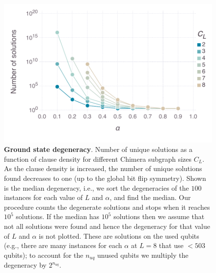 \begin{figure}[t]
\begin{center}
\includegraphics[width=\columnwidth]{chapters/Planted/problem_degeneracy_fullsize}
\caption{\textbf{Ground state degeneracy}.
Number of unique solutions as a function of clause density for different Chimera subgraph sizes $C_L$.
As the clause density is increased, the number of unique solutions found decreases to one (up to the global bit flip symmetry).
Shown is the median degeneracy, i.e., we sort the degeneracies of the $100$ instances for each value of $L$ and $\alpha$, and find the median. Our procedure counts the degenerate solutions and stops when it reaches $10^5$ solutions. If the median has $10^5$ solutions then we assume that not all solutions were found and hence the degeneracy for that value of $L$ and $\alpha$ is not plotted.
These are solutions on the used qubits (e.g., there are many instances for each $\alpha$ at $L=8$ that use $< 503$ qubits); to account for the $n_{uq}$ unused qubits we multiply the degeneracy by $2^{n_{uq}}$.}
 \label{fig:numDiffSols}
\end{center}
\end{figure}


